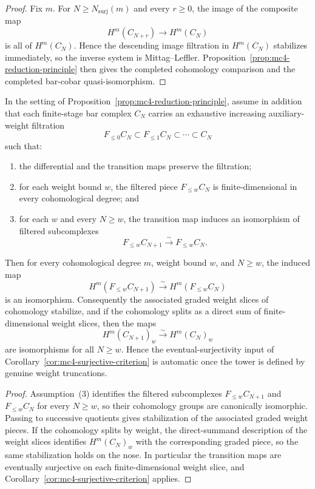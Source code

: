 \begin{proof}
Fix $m$.  For $N \ge N_{\mathrm{surj}}(m)$ and every $r \ge 0$, the image
of the composite map
\[
H^m(C_{N+r}) \longrightarrow H^m(C_N)
\]
is all of $H^m(C_N)$.  Hence the descending image filtration in
$H^m(C_N)$ stabilizes immediately, so the inverse system is
Mittag--Leffler.  Proposition~\ref{prop:mc4-reduction-principle} then
gives the completed cohomology comparison and the completed bar-cobar
quasi-isomorphism.
\end{proof}

\begin{proposition}
\label{prop:mc4-weight-cutoff}
In the setting of Proposition~\ref{prop:mc4-reduction-principle},
assume in addition that each finite-stage bar complex $C_N$ carries an
exhaustive increasing auxiliary-weight filtration
\[
F_{\le 0}C_N \subset F_{\le 1}C_N \subset \cdots \subset C_N
\]
such that:
\begin{enumerate}
\item the differential and the transition maps preserve the filtration;
\item for each weight bound $w$, the filtered piece $F_{\le w}C_N$ is
  finite-dimensional in every cohomological degree; and
\item for each $w$ and every $N \ge w$, the transition map induces an
  isomorphism of filtered subcomplexes
  \[
  F_{\le w}C_{N+1} \xrightarrow{\sim} F_{\le w}C_N.
  \]
\end{enumerate}
Then for every cohomological degree $m$, weight bound $w$, and
$N \ge w$, the induced map
\[
H^m(F_{\le w}C_{N+1}) \xrightarrow{\sim} H^m(F_{\le w}C_N)
\]
is an isomorphism.  Consequently the associated graded weight slices of
cohomology stabilize, and if the cohomology splits as a direct sum of
finite-dimensional weight slices, then the maps
\[
H^m(C_{N+1})_w \xrightarrow{\sim} H^m(C_N)_w
\]
are isomorphisms for all $N \ge w$.  Hence the eventual-surjectivity
input of Corollary~\ref{cor:mc4-surjective-criterion} is automatic once
the tower is defined by genuine weight truncations.
\end{proposition}

\begin{proof}
Assumption~\textup{(3)} identifies the filtered subcomplexes
$F_{\le w}C_{N+1}$ and $F_{\le w}C_N$ for every $N \ge w$, so their
cohomology groups are canonically isomorphic.  Passing to successive
quotients gives stabilization of the associated graded weight pieces.
If the cohomology splits by weight, the direct-summand description of
the weight slices identifies $H^m(C_N)_w$ with the corresponding
graded piece, so the same stabilization holds on the nose.  In
particular the transition maps are eventually surjective on each
finite-dimensional weight slice, and
Corollary~\ref{cor:mc4-surjective-criterion} applies.
\end{proof}

